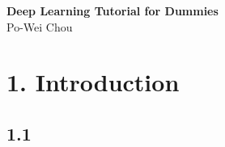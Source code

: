 \documentclass{article}
\begin{document}
% 

\begin{center}
\textsf{ \huge\textbf{Deep Learning Tutorial for Dummies} } \\
\Large\textsf{Po-Wei Chou}
\end{center}


\section{1. Introduction}

\subsection*{1.1 }
\end{document}
